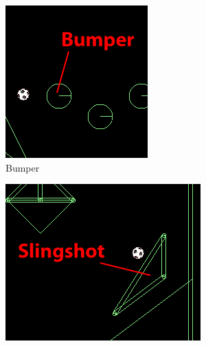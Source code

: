 \documentclass[fontsize=12pt,
               paper=a4,
               twoside=false,
               parskip=half,
               ]{scrartcl}
\begin{document}
\begin{figure}
	\centering
	\begin{subfigure}[b]{0.225\textwidth}
		\centering
		\includegraphics[width=\textwidth]{./img/manual/bumper.png}
		\caption[Bumper]{Bumper}
		\label{fig:bumper}
	\end{subfigure}
	\quad
	\begin{subfigure}[b]{0.3\textwidth}
		\centering
		\includegraphics[width=\textwidth]{./img/manual/slingshot.png}

\end{subfigure}
\end{figure}
\end{document}

